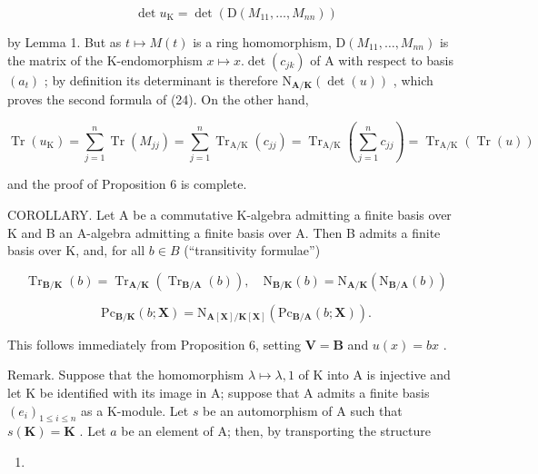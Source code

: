 \[
\det u _ {\mathrm{K}} = \det (\mathrm{D} (M _ {1 1}, \dots , M _ {n n}))
\]

by Lemma 1. But as \(t \mapsto M(t)\) is a ring homomorphism, \(\mathrm{D}(M_{11},\ldots ,M_{nn})\) is the matrix of the K-endomorphism \(x \mapsto x.\det (c_{jk})\) of A with respect to basis \((a_t)\) ; by definition its determinant is therefore \(\mathrm{N}_{\mathbf{A} / \mathbf{K}}(\det (u))\) , which proves the second formula of (24). On the other hand,

\[
\operatorname{Tr} \left(u _ {\mathrm{K}}\right) = \sum_ {j = 1} ^ {n} \operatorname{Tr} \left(M _ {j j}\right) = \sum_ {j = 1} ^ {n} \operatorname{Tr} _ {\mathrm{A} / \mathrm{K}} \left(c _ {j j}\right) = \operatorname{Tr} _ {\mathrm{A} / \mathrm{K}} \left(\sum_ {j = 1} ^ {n} c _ {j j}\right) = \operatorname{Tr} _ {\mathrm{A} / \mathrm{K}} (\operatorname{Tr} (u))
\]

and the proof of Proposition 6 is complete.

COROLLARY. Let A be a commutative K-algebra admitting a finite basis over K and B an A-algebra admitting a finite basis over A. Then B admits a finite basis over K, and, for all \(b \in B\) (``transitivity formulae'')

\[
\operatorname{Tr} _ {\mathbf {B} / \mathbf {K}} (b) = \operatorname{Tr} _ {\mathbf {A} / \mathbf {K}} (\operatorname{Tr} _ {\mathbf {B} / \mathbf {A}} (b)), \quad \mathrm{N} _ {\mathbf {B} / \mathbf {K}} (b) = \mathrm{N} _ {\mathbf {A} / \mathbf {K}} (\mathrm{N} _ {\mathbf {B} / \mathbf {A}} (b))\tag{26}
\]

\[
\mathrm{Pc} _ {\mathbf {B} / \mathbf {K}} (b; \mathbf {X}) = \mathrm{N} _ {\mathbf {A} [ \mathbf {X} ] / \mathbf {K} [ \mathbf {X} ]} (\mathrm{Pc} _ {\mathbf {B} / \mathbf {A}} (b; \mathbf {X})).
\]

This follows immediately from Proposition 6, setting \(\mathbf{V} = \mathbf{B}\) and \(u(x) = bx\) .

Remark. Suppose that the homomorphism \(\lambda \mapsto \lambda, 1\) of K into A is injective and let K be identified with its image in A; suppose that A admits a finite basis \((e_i)_{1 \leqslant i \leqslant n}\) as a K-module. Let \(s\) be an automorphism of A such that \(s(\mathbf{K}) = \mathbf{K}\) . Let \(a\) be an element of A; then, by transporting the structure

\begin{enumerate}
\def\labelenumi{(\arabic{enumi})}
\setcounter{enumi}{26}
\tightlist
\item
\end{enumerate}

